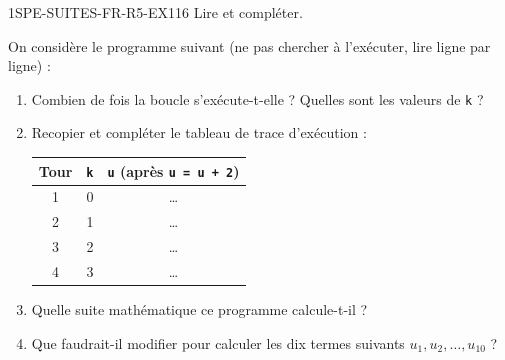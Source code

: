 \begin{exercice}{1SPE-SUITES-FR-R5-EX1}{1}{6}
Lire et compléter.

On considère le programme suivant (ne pas chercher à l'exécuter, lire ligne par ligne) :

\medskip


\begin{enumerate}
  \item Combien de fois la boucle s'exécute-t-elle ? Quelles sont les valeurs de \verb|k| ?
  \item Recopier et compléter le tableau de trace d'exécution :

\begin{center}
\begin{tabular}{|c|c|c|}
\hline
Tour & \verb|k| & \verb|u| (après \verb|u = u + 2|) \\
\hline
1 & 0 & \ldots \\
2 & 1 & \ldots \\
3 & 2 & \ldots \\
4 & 3 & \ldots \\
\hline
\end{tabular}
\end{center}

  \item Quelle suite mathématique ce programme calcule-t-il ?
  \item Que faudrait-il modifier pour calculer les dix termes suivants $u_1, u_2, \ldots, u_{10}$ ?
\end{enumerate}
\end{exercice}

